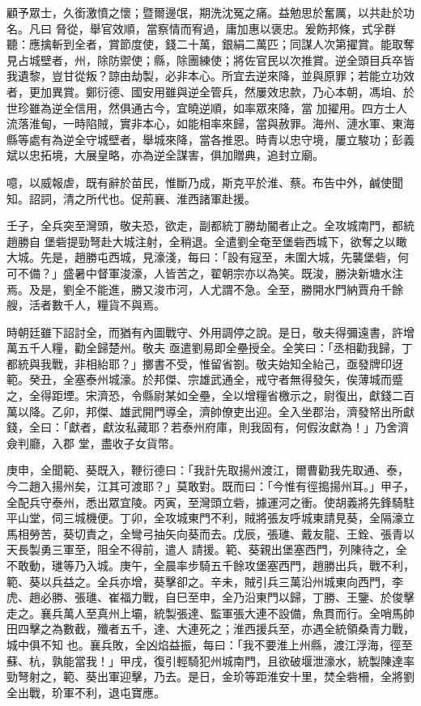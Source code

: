 \begin{pinyinscope}
 顧予眾士，久銜激憤之懷；暨爾邊氓，期洗沈冤之痛。益勉思於奮厲，以共赴於功名。凡曰
 脅從，舉官效順，當察情而宥過，庸加惠以褒忠。爰飭邦條，式孚群聽：應擒斬到全者，賞節度使，錢二十萬，銀絹二萬匹；同謀人次第擢賞。能取奪見占城壁者，州，除防禦使；縣，除團練使；將佐官民以次推賞。逆全頭目兵卒皆我遺黎，豈甘從叛？諒由劫製，必非本心。所宜去逆來降，並與原罪；若能立功效者，更加異賞。鄭衍德、國安用雖與逆全管兵，然屢效忠款，乃心本朝，馮垍、於世珍雖為逆全信用，然俱通古今，宜曉逆順，如率眾來降，當
 加擢用。四方士人流落淮甸，一時陷賊，實非本心，如能相率來歸，當與赦罪。海州、漣水軍、東海縣等處有為逆全守城壁者，舉城來降，當各推恩。時青以忠守境，屢立駿功；彭義斌以忠拓境，大展皇略，亦為逆全謀害，俱加贈典，追封立廟。



 噫，以威報虐，既有辭於苗民，惟斷乃成，斯克平於淮、蔡。布告中外，鹹使聞知。詔詞，清之所代也。促荊襄、淮西諸軍赴援。



 壬子，全兵突至灣頭，敬夫恐，欲走，副都統丁勝劫閽者止之。全攻城南門，都統趙勝自
 堡砦提勁弩赴大城注射，全稍退。全遣劉全奄至堡砦西城下，欲奪之以瞰大城。先是，趙勝屯西城，見濠淺，每曰：「設有寇至，未圍大城，先襲堡砦，何可不備？」盛暑中督軍浚濠，人皆苦之，翟朝宗亦以為笑。既浚，勝決新塘水注焉。及是，劉全不能進，勝又浚市河，人尤謂不急。全至，勝開水門納賈舟千餘艘，活者數千人，糧貨不與焉。



 時朝廷雖下詔討全，而猶有內圖戰守、外用調停之說。是日，敬夫得彌遠書，許增萬五千人糧，勸全歸楚州。敬夫
 亟遣劉易即全壘授全。全笑曰：「丞相勸我歸，丁都統與我戰，非相紿耶？」擲書不受，惟留省劄。敬夫始知全紿己，亟發牌印迓範。癸丑，全塞泰州城濠。於邦傑、宗雄武通全，戒守者無得發矢，俟薄城而蹙之，全得距堙。宋濟恐，令縣尉某如全壘，全以增糧省檄示之，尉復出，獻錢二百萬以降。乙卯，邦傑、雄武開門導全，濟帥僚吏出迎。全入坐郡治，濟發帑出所獻錢，全曰：「獻者，獻汝私藏耶？若泰州府庫，則我固有，何假汝獻為！」乃舍濟僉判廳，入郡
 堂，盡收子女貨幣。



 庚申，全聞範、葵既入，鞭衍德曰：「我計先取揚州渡江，爾曹勸我先取通、泰，今二趙入揚州矣，江其可渡耶？」莫敢對。既而曰：「今惟有徑搗揚州耳。」甲子，全配兵守泰州，悉出眾宜陵。丙寅，至灣頭立砦，據運河之衝。使胡義將先鋒騎駐平山堂，伺三城機便。丁卯，全攻城東門不利，賊將張友呼城東請見葵，全隔濠立馬相勞苦，葵切責之，全彎弓抽矢向葵而去。戊辰，張璡、戴友龍、王銓、張青以天長製勇三軍至，阻全不得前，遣人
 請援。範、葵親出堡塞西門，列陳待之，全不敢動，璡等乃入城。庚午，全晨率步騎五千餘攻堡塞西門，趙勝出兵，戰不利，範、葵以兵益之。全兵亦增，葵擊卻之。辛未，賊引兵三萬沿州城東向西門，李虎、趙必勝、張璡、崔福力戰，自巳至申，全乃沿東門以歸，丁勝、王鑒、於俊擊走之。襄兵萬人至真州上壩，統製張達、監軍張大連不設備，魚貫而行。全哨馬帥田四擊之為數截，殲者五千，達、大連死之；淮西援兵至，亦遇全統領桑青力戰，城中俱不知
 也。襄兵敗，全凶焰益振，每曰：「我不要淮上州縣，渡江浮海，徑至蘇、杭，孰能當我！」甲戌，復引輕騎犯州城南門，且欲破堰泄濠水，統製陳達率勁弩射之，範、葵出軍迎擊，乃去。是日，金玠等距淮安十里，焚全砦柵，全將劉全出戰，玠軍不利，退屯寶應。




\end{pinyinscope}
